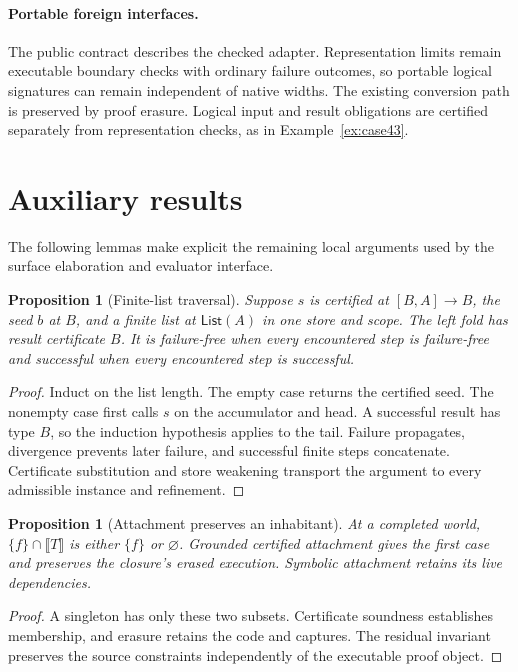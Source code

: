 \documentclass[10pt,a4paper]{article}
\newcommand{\sem}[1]{\llbracket #1\rrbracket}
\newcommand{\List}{\mathsf{List}}
\newtheorem{proposition}[definition]{Proposition}
\theoremstyle{remark}
\begin{document}
\paragraph{Portable foreign interfaces.}
The public contract describes the checked adapter. Representation limits remain
executable boundary checks with ordinary failure outcomes, so portable logical
signatures can remain independent of native widths. The existing conversion
path is preserved by proof erasure. Logical input and result obligations are
certified separately from representation checks, as in
Example~\ref{ex:case43}.

\section{Auxiliary results}
\label{app:auxiliary}
The following lemmas make explicit the remaining local arguments used by the
surface elaboration and evaluator interface.

\begin{proposition}[Finite-list traversal]\label{prop:fold}
Suppose $s$ is certified at $[B,A]\to B$, the seed $b$ at $B$, and a finite
list at $\List(A)$ in one store and scope. The left fold has result certificate
$B$. It is failure-free when every encountered step is failure-free and
successful when every encountered step is successful.
\end{proposition}
\begin{proof}
Induct on the list length. The empty case returns the certified seed. The
nonempty case first calls $s$ on the accumulator and head. A successful result
has type $B$, so the induction hypothesis applies to the tail. Failure
propagates, divergence prevents later failure, and successful finite steps
concatenate. Certificate substitution and store weakening transport the
argument to every admissible instance and refinement.
\end{proof}

\begin{proposition}[Attachment preserves an inhabitant]\label{prop:attach-world}
At a completed world, $\{f\}\cap\sem T$ is either $\{f\}$ or
$\varnothing$. Grounded certified attachment gives the first case and preserves
the closure's erased execution. Symbolic attachment retains its live dependencies.
\end{proposition}
\begin{proof}
A singleton has only these two subsets. Certificate soundness establishes
membership, and erasure retains the code and captures. The residual invariant
preserves the source constraints independently of the executable proof object.
\end{proof}
\end{document}
